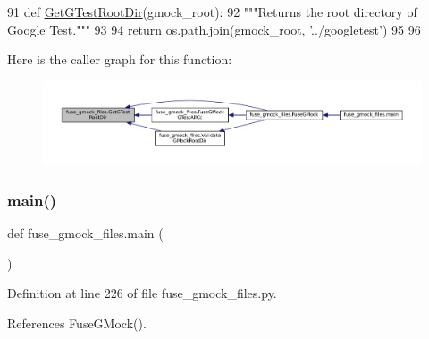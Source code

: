 \begin{DoxyCode}
91 \textcolor{keyword}{def }\hyperlink{namespacefuse__gmock__files_aae591d77d2d969394996f9fc2017824c}{GetGTestRootDir}(gmock\_root):
92   \textcolor{stringliteral}{"""Returns the root directory of Google Test."""}
93 
94   \textcolor{keywordflow}{return} os.path.join(gmock\_root, \textcolor{stringliteral}{'../googletest'})
95 
96 
\end{DoxyCode}
Here is the caller graph for this function\+:
\nopagebreak
\begin{figure}[H]
\begin{center}
\leavevmode
\includegraphics[width=350pt]{namespacefuse__gmock__files_aae591d77d2d969394996f9fc2017824c_icgraph}
\end{center}
\end{figure}
\mbox{\label{namespacefuse__gmock__files_a64e8cd1ead5a1454265cbc2d3db4d425}} 
\subsubsection{\texorpdfstring{main()}{main()}}
{\footnotesize\ttfamily def fuse\+\_\+gmock\+\_\+files.\+main (\begin{DoxyParamCaption}{ }\end{DoxyParamCaption})}



Definition at line 226 of file fuse\+\_\+gmock\+\_\+files.\+py.



References Fuse\+G\+Mock().


